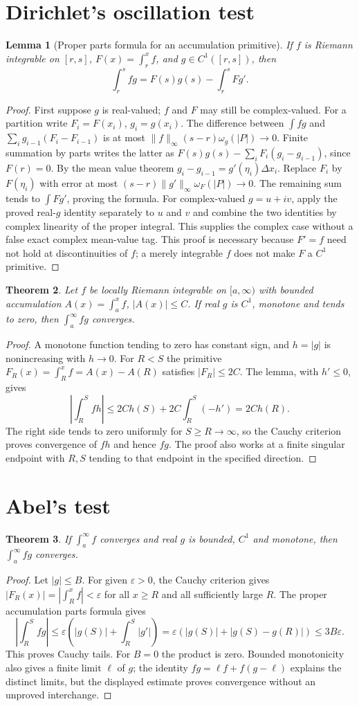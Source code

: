 \documentclass[11pt,oneside,a4paper]{book}
\newtheorem{theorem}{Theorem}[chapter]
\newtheorem{lemma}[theorem]{Lemma}
\theoremstyle{definition}
\theoremstyle{remark}
\newcommand{\eps}{\varepsilon}
\newcommand{\KEntry}[2]{\Needspace{7\baselineskip}\section{#2}\label{#1}{\small\sffamily\color{black!60}\detokenize{#1}}\par}
\begin{document}
\KEntry{K03.10.dirichlet}{Dirichlet's oscillation test}
\begin{lemma}[Proper parts formula for an accumulation primitive]
If $f$ is Riemann integrable on $[r,s]$, $F(x)=\int_r^xf$, and
$g\in C^1([r,s])$, then
\[\int_r^sfg=F(s)g(s)-\int_r^sFg'.
\]
\end{lemma}
\begin{proof}
First suppose $g$ is real-valued; $f$ and $F$ may still be complex-valued. For a partition write $F_i=F(x_i)$, $g_i=g(x_i)$.
The difference between $\int fg$ and
$\sum_i g_{i-1}(F_i-F_{i-1})$ is at most
$\|f\|_\infty(s-r)\omega_g(|P|)\to0$.
Finite summation by parts writes the latter as
$F(s)g(s)-\sum_iF_i(g_i-g_{i-1})$, since $F(r)=0$.
By the mean value theorem $g_i-g_{i-1}=g'(\eta_i)\Delta x_i$.
Replace $F_i$ by $F(\eta_i)$ with error at most
$(s-r)\|g'\|_\infty\omega_F(|P|)\to0$.
The remaining sum tends to $\int Fg'$, proving the formula.
For complex-valued $g=u+iv$, apply the proved real-$g$ identity separately to $u$ and $v$ and combine the two identities by complex linearity of the proper integral. This supplies the complex case without a false exact complex mean-value tag.
This proof is necessary because $F'=f$ need not hold at discontinuities
of $f$; a merely integrable $f$ does not make $F$ a $C^1$ primitive.
\end{proof}
\begin{theorem}
Let $f$ be locally Riemann integrable on $[a,\infty)$ with bounded
accumulation $A(x)=\int_a^xf$, $|A(x)|\le C$. If real $g$ is $C^1$,
monotone and tends to zero, then $\int_a^\infty fg$ converges.
\end{theorem}
\begin{proof}
A monotone function tending to zero has constant sign, and $h=|g|$
is nonincreasing with $h\to0$. For $R<S$ the primitive
$F_R(x)=\int_R^xf=A(x)-A(R)$ satisfies $|F_R|\le2C$.
The lemma, with $h'\le0$, gives
\[\left|\int_R^Sfh\right|
\le2Ch(S)+2C\int_R^S(-h')=2Ch(R).
\]
The right side tends to zero uniformly for $S\ge R\to\infty$,
so the Cauchy criterion proves convergence of $fh$ and hence $fg$.
The proof also works at a finite singular endpoint with $R,S$ tending
to that endpoint in the specified direction.
\end{proof}

\KEntry{K03.10.abel}{Abel's test}
\begin{theorem}
If $\int_a^\infty f$ converges and real $g$ is bounded, $C^1$ and
monotone, then $\int_a^\infty fg$ converges.
\end{theorem}
\begin{proof}
Let $|g|\le B$. For given $\eps>0$, the Cauchy criterion gives
$|F_R(x)|=|\int_R^xf|<\eps$ for all $x\ge R$ and all sufficiently
large $R$. The proper accumulation parts formula gives
\[\left|\int_R^Sfg\right|
\le\eps\left(|g(S)|+\int_R^S|g'|\right)
=\eps(|g(S)|+|g(S)-g(R)|)\le3B\eps.
\]
This proves Cauchy tails. For $B=0$ the product is zero.
Bounded monotonicity also gives a finite limit $\ell$ of $g$; the
identity $fg=\ell f+f(g-\ell)$ explains the distinct limits, but the
displayed estimate proves convergence without an unproved interchange.
\end{proof}
\end{document}

